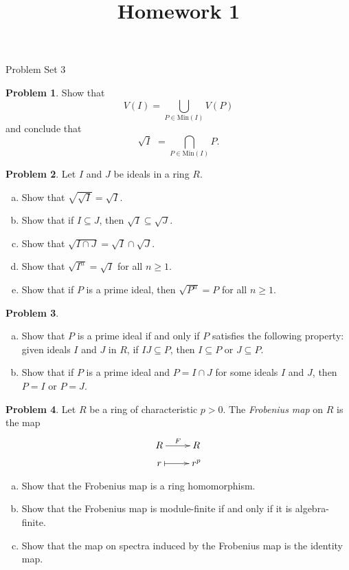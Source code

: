 \documentclass[11pt]{article}
\title{}
\date{\vspace{-0.5in}}
\title{Homework 1}
\theoremstyle{definition}
\newtheorem{problem}{Problem}
\begin{document}
\thispagestyle{fancy}
\pagestyle{fancy}


\begin{center}
	{\LARGE Problem Set 3}
\end{center}



\begin{problem}
	Show that
	$$V(I) = \bigcup_{P \in \textrm{Min}(I)} V(P)$$
	and conclude that
	$$\sqrt{I} \,\, = \bigcap_{P \in \textrm{Min}(I)} P.$$
\end{problem}





\begin{problem}	
Let $I$ and $J$ be ideals in a ring $R$.
\begin{enumerate}[a)]
\item Show that $\sqrt{\sqrt{I}} = \sqrt{I}$.
\item Show that if $I \subseteq J$, then $\sqrt{I} \subseteq \sqrt{J}$.
\item Show that $\sqrt{I \cap J} = \sqrt{I} \cap \sqrt{J}$.
\item Show that $\sqrt{I^n} = \sqrt{I}$ for all $n \geqslant 1$.
\item Show that if $P$ is a prime ideal, then $\sqrt{P^n} = P$ for all $n \geqslant 1$.
\end{enumerate}
\end{problem}

\begin{problem}$\,$
	\begin{enumerate}[a)]
		\item Show that $P$ is a prime ideal if and only if $P$ satisfies the following property: given ideals $I$ and $J$ in $R$, if $IJ \subseteq P$, then $I \subseteq P$ or $J \subseteq P$.
		\item Show that if $P$ is a prime ideal and $P = I \cap J$ for some ideals $I$ and $J$, then $P = I$ or $P = J$.
	\end{enumerate}
\end{problem}


\begin{problem}
	Let $R$ be a ring of characteristic $p>0$. The \emph{Frobenius map} on $R$ is the map 
	$$\xymatrix@R=2mm{R \ar[r]^-{F} & R \\ r \ar@{|->}[r] &r^p}$$
\begin{enumerate}[a)]
	\item Show that the Frobenius map is a ring homomorphism.
	\item Show that the Frobenius map is module-finite if and only if it is algebra-finite.
	\item Show that the map on spectra induced by the Frobenius map is the identity map.
\end{enumerate}
\end{problem} 
\end{document}
